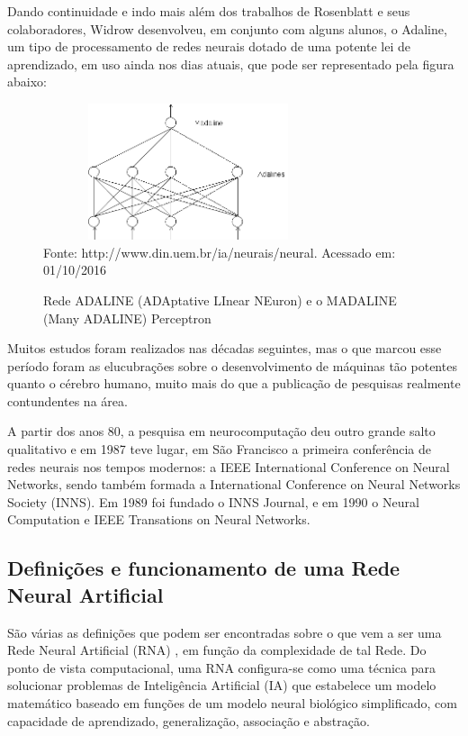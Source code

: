 Dando continuidade e indo mais além dos trabalhos de Rosenblatt e seus colaboradores, Widrow desenvolveu, em conjunto com alguns 
alunos, o Adaline, um tipo de processamento de redes neurais dotado de uma potente lei de aprendizado, em uso ainda nos dias atuais, 
que pode ser representado pela figura abaixo:

\begin{figure}[!ht]
\centering
\caption{Rede ADALINE (ADAptative LInear NEuron) e o MADALINE (Many ADALINE) Perceptron}
\vspace{1mm}
\includegraphics[width=85mm, height=40mm]{Figuras/Neural/Adaline.png}\\
\tiny Fonte: http://www.din.uem.br/ia/neurais/neural. Acessado em: 01/10/2016
\end{figure}

\pagebreak

Muitos estudos foram realizados nas décadas seguintes, mas o que marcou esse período foram as elucubrações sobre o 
desenvolvimento de máquinas tão potentes quanto o cérebro humano, muito mais do que a publicação de pesquisas realmente 
contundentes na área.

A partir dos anos 80, a pesquisa em neurocomputação deu outro grande salto qualitativo e em 1987 teve lugar, em São Francisco a 
primeira conferência de redes neurais nos tempos modernos: a IEEE International Conference on Neural Networks, sendo também formada 
a International Conference on Neural Networks Society (INNS). 
Em 1989 foi fundado o INNS Journal, e em 1990 o Neural Computation e IEEE Transations on Neural Networks.

\subsection{Definições e funcionamento de uma Rede Neural Artificial}

São várias as definições que podem ser encontradas sobre o que vem a ser uma Rede Neural Artificial (RNA) \cite{Castanheira}, em função da complexidade de tal Rede. 
Do ponto de vista computacional, uma RNA configura-se como uma técnica para solucionar problemas de Inteligência Artificial (IA) que estabelece um modelo matemático 
baseado em funções de um modelo neural biológico simplificado, com capacidade de aprendizado, generalização, associação e abstração.

